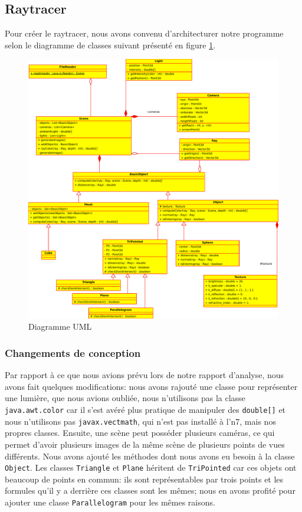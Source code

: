 \documentclass[a4paper]{article}
\begin{document}
  \subsection{Raytracer}
    Pour créer le raytracer, nous avons convenu d'architecturer notre programme
    selon le diagramme de classes suivant présenté en figure \ref{fig:uml}.
    \begin{figure}[p]
      \centerline{\includegraphics[width=1.2\textwidth]{uml.pdf}}
      \caption{Diagramme UML\label{fig:uml}}
    \end{figure}

    \subsubsection{Changements de conception}
      Par rapport à ce que nous avions prévu lors de notre rapport d'analyse,
      nous avons fait quelques modifications: nous avons rajouté une classe
      pour représenter une lumière, que nous avions oubliée, nous n'utilisons
      pas la classe \verb+java.awt.color+ car il s'est avéré plus pratique de
      manipuler des \verb+double[]+ et nous n'utilisons pas
      \verb+javax.vectmath+, qui n'est pas installé à l'n7, mais nos
      propres classes.
      Ensuite, une scène peut posséder plusieurs caméras, ce qui permet d'avoir
      plusieurs images de la même scène de plusieurs points de vues différents.
      Nous avons ajouté les méthodes dont nous avons eu besoin à la classe
      \verb+Object+. Les classes \verb+Triangle+ et \verb+Plane+ héritent de
      \verb+TriPointed+ car ces objets ont beaucoup de points en commun: ils
      sont représentables par trois points et les formules qu'il y a derrière
      ces classes sont les mêmes; nous en avons profité pour ajouter une classe
      \verb+Parallelogram+ pour les mêmes raisons.
      
\end{document}
